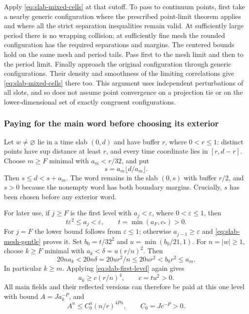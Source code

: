 Apply \eqref{eq:slab-mixed-cells} at that cutoff. To pass to continuum
points, first take a nearby generic configuration where the prescribed
point-limit theorem applies and where all the strict separation
inequalities remain valid. At sufficiently large period there is no
wrapping collision; at sufficiently fine mesh the rounded configuration
has the required separations and margins. The centered bounds hold on
the same mesh and period tails. Pass first to the mesh limit and then
to the period limit. Finally approach the original configuration through
generic configurations. Their density and smoothness of the limiting
correlations give \eqref{eq:slab-mixed-cells} there too. This argument
uses independent perturbations of all slots, and so does not assume
point convergence on a projection tie or on the lower-dimensional set
of exactly congruent configurations.

\subsubsection{Paying for the main word before choosing its exterior}

Let $w\ne\varnothing$ lie in a time slab $(0,d)$ and have buffer $r$,
where $0<r\leq1$: distinct points have sup distance at least $r$, and
every time coordinate lies in $[r,d-r]$. Choose $m\geq F$ minimal
with $a_m<r/32$, and put
\[
                   s=a_m\lfloor d/a_m\rfloor.
\]
Then $s\leq d<s+a_m$. The word remains in the slab $(0,s)$ with
buffer $r/2$, and $s>0$ because the nonempty word has both boundary
margins. Crucially, $s$ has been chosen before any exterior word.

For later use, if $j\geq F$ is the first level with $a_j<\varepsilon$,
where $0<\varepsilon\leq1$, then
\begin{equation}\label{eq:slab-first-level}
             t\varepsilon^2\leq a_j<\varepsilon,
             \qquad t=\min(a_F,c_*)>0.
\end{equation}
For $j=F$ the lower bound follows from $\varepsilon\leq1$; otherwise
$a_{j-1}\geq\varepsilon$ and \eqref{eq:slab-mesh-gentle} proves it.
Set $b_0=t/32^2$ and $u=\min(b_0/21,1)$. For $n=|w|\geq1$, choose
$k\geq F$ minimal with $a_k<\delta=u(r/n)^2$. Then
\[
 20n a_k<20n\delta=20u r^2/n\leq20u r^2<b_0r^2\leq a_m.
\]
In particular $k\geq m$. Applying \eqref{eq:slab-first-level} again gives
\begin{equation}\label{eq:slab-fine-lower}
                 a_k\geq c(r/n)^4,\qquad c=tu^2>0.
\end{equation}
All main fields and their reflected versions can therefore be paid at
this one level with bound $A=Ja_k^{-P}$, and
\begin{equation}\label{eq:slab-radius-produced}
 A^n\leq C_0^n(n/r)^{4Pn},\qquad C_0=Jc^{-P}>0.
\end{equation}

